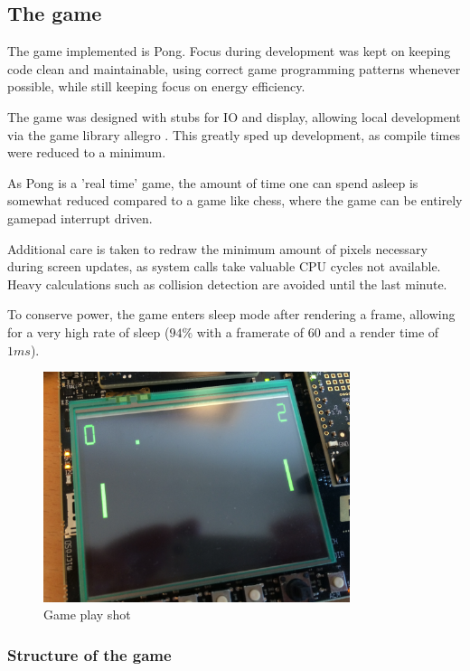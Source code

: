 \subsection{The game}

The game implemented is Pong. Focus during development was kept on keeping code
clean and maintainable, using correct game programming patterns whenever
possible, while still keeping focus on energy efficiency.

The game was designed with stubs for IO and display,
allowing local development via the game library allegro \cite{allegro}.
This greatly sped up development, as compile times were reduced to a minimum.

As Pong is a 'real time' game, the amount of time one can spend asleep is
somewhat reduced compared to a game like chess,
where the game can be entirely gamepad interrupt driven.

Additional care is taken to redraw the minimum amount of pixels necessary
during screen updates, as system calls take valuable CPU cycles not available.
Heavy calculations such as collision detection are avoided until the last
minute.

To conserve power, the game enters sleep mode after rendering a frame,
allowing for a very high rate of sleep
($ 94\% $ with a framerate of $ 60 $ and a render time of $ 1 ms $).

\begin{figure}[H]
\centering
\includegraphics[width=0.8\textwidth]{figures/gameplay.jpg}
\caption{Game play shot}

\end{figure}

\subsubsection{Structure of the game}

